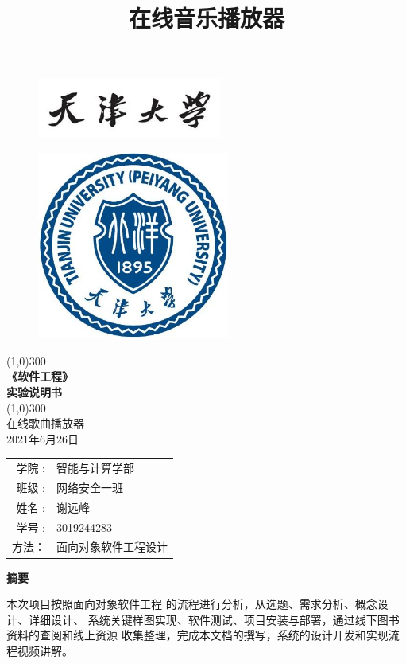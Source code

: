 \documentclass[UTF8,14pt]{article}
\title{在线音乐播放器}
\numberwithin{figure}{subsubsection}
\numberwithin{table}{subsubsection}
\begin{document}
\begin{titlepage}
	\begin{center}
		\begin{figure}[H]
			\centering
			\includegraphics[width=6.048cm,height=1.98cm]{figures/Content.png}
		\end{figure}
		\begin{figure}[H]
			\centering
			\includegraphics[width=6.318cm,height=6.174cm]{figures/封面.png}
		\end{figure}
		\vspace*{2cm}
		\line(1,0){300}\\
		[-0.2cm]
		\Huge{\bfseries 《软件工程》\\实验说明书}\\
		\vspace*{-0.7cm}
		\line(1,0){300}\\
		\LARGE {在线歌曲播放器\\
			2021年6月26日}\\
		[0.6cm]
		\Large{
			\begin{tabular}{rl}
				学院 :        & 智能与计算学部       \\
				班级 :        & 网络安全一班         \\
				姓名        : & 谢远峰               \\
				学号       :  & 3019244283           \\
				方法：        & 面向对象软件工程设计
			\end{tabular}
		}
	\end{center}

\end{titlepage}
\clearpage
\centerline{\Large{\bfseries{摘要}}}
\vspace*{0.5cm}
本次项目按照面向对象软件工程	的流程进行分析，从选题、需求分析、概念设计、详细设计、
系统关键样图实现、软件测试、项目安装与部署，通过线下图书资料的查阅和线上资源
收集整理，完成本文档的撰写，系统的设计开发和实现流程视频讲解。
\end{document}
